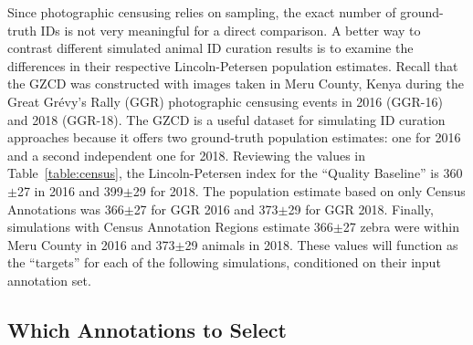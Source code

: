Since photographic censusing relies on sampling, the exact number of ground-truth IDs is not very meaningful for a direct comparison.  A better way to contrast different simulated animal ID curation results is to examine the differences in their respective Lincoln-Petersen population estimates.  Recall that the GZCD was constructed with images taken in Meru County, Kenya during the Great Gr\'evy's Rally (GGR) photographic censusing events in 2016 (GGR-16) and 2018 (GGR-18).  The GZCD is a useful dataset for simulating ID curation approaches because it offers two ground-truth population estimates: one for 2016 and a second independent one for 2018.  Reviewing the values in Table~\ref{table:census}, the Lincoln-Petersen index for the ``Quality Baseline'' is 360$\pm$27 in 2016 and 399$\pm$29 for 2018.  The population estimate based on only Census Annotations was 366$\pm$27 for GGR 2016 and 373$\pm$29 for GGR 2018.  Finally, simulations with Census Annotation Regions estimate 366$\pm$27 zebra were within Meru County in 2016 and 373$\pm$29 animals in 2018.  These values will function as the ``targets'' for each of the following simulations, conditioned on their input annotation set.

\subsection{Which Annotations to Select}

